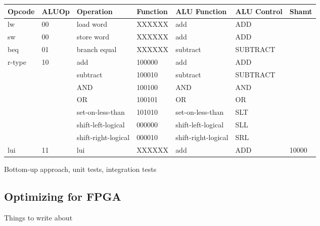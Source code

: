 \begin{table}
    \begin{tabular}{|l|l|l|l|l|l|l|}
    \hline
    Opcode & ALUOp & Operation           & Function & ALU Function        & ALU Control & Shamt   \\ \hline
    lw     & 00    & load word           & XXXXXX   & add                 & ADD         & \\ \hline
    sw     & 00    & store word          & XXXXXX   & add                 & ADD         & \\ \hline
    beq    & 01    & branch equal        & XXXXXX   & subtract            & SUBTRACT    & \\ \hline
    r-type & 10    & add                 & 100000   & add                 & ADD         & \\ \cline{3-7}
           &       & subtract            & 100010   & subtract            & SUBTRACT    & \\ \cline{3-7}
           &       & AND                 & 100100   & AND                 & AND         & \\ \cline{3-7}
           &       & OR                  & 100101   & OR                  & OR          & \\ \cline{3-7}
           &       & set-on-less-than    & 101010   & set-on-less-than    & SLT         & \\ \cline{3-7}
           &       & shift-left-logical  & 000000   & shift-left-logical  & SLL         & \\ \cline{3-7}
           &       & shift-right-logical & 000010   & shift-right-logical & SRL         & \\ \hline
    lui    & 11    & lui                 & XXXXXX   & add                 & ADD         & 10000 \\ \hline
    \end{tabular}
\end{table}

Bottom-up approach, unit tests, integration tests

\subsection{Optimizing for FPGA}


Things to write about

